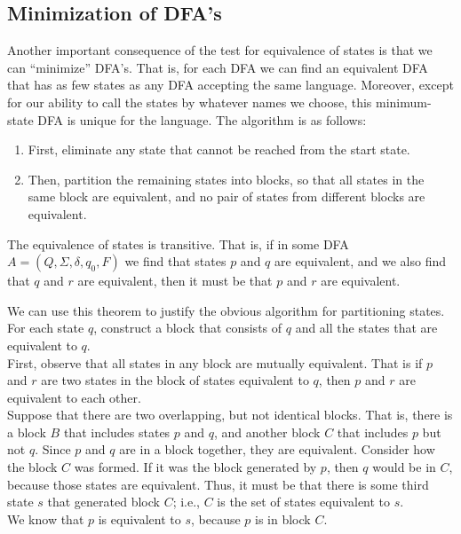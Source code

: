 \documentclass[]{article}
\begin{document}
  \subsection*{Minimization of DFA's}
    Another important consequence of the test for equivalence of states is that
    we can ``minimize'' DFA's. That is, for each DFA we can find an equivalent
    DFA that has as few states as any DFA accepting the same language. Moreover,
    except for our ability to call the states by whatever names we choose, this
    minimum-state DFA is unique for the language. The algorithm is as follows:
      \begin{enumerate}
        \item First, eliminate any state that cannot be reached from the start
        state.
        \item Then, partition the remaining states into blocks, so that all
        states in the same block are equivalent, and no pair of states from
        different blocks are equivalent.
      \end{enumerate}
      \begin{thm}
        The equivalence of states is transitive. That is, if in some DFA $A =
        (Q, \Sigma, \delta, q_0, F)$ we find that states $p$ and $q$ are
        equivalent, and we also find that $q$ and $r$ are equivalent, then it
        must be that $p$ and $r$ are equivalent.
      \end{thm}
    We can use this theorem to justify the obvious algorithm for partitioning
    states. For each state $q$, construct a block that consists of $q$ and all
    the states that are equivalent to $q$. \\
    First, observe that all states in any block are mutually equivalent. That is
    if $p$ and $r$ are two states in the block of states equivalent to $q$, then
    $p$ and $r$ are equivalent to each other. \\
    \indent Suppose that there are two overlapping, but not identical blocks.
    That is, there is a block $B$ that includes states $p$ and $q$, and another
    block $C$ that includes $p$ but not $q$. Since $p$ and $q$ are in a block
    together, they are equivalent. Consider how the block $C$ was formed. If it
    was the block generated by $p$, then $q$ would be in $C$, because those
    states are equivalent. Thus, it must be that there is some third state $s$
    that generated block $C$; i.e., $C$ is the set of states equivalent to
    $s$. \\
    \indent We know that $p$ is equivalent to $s$, because $p$ is in block $C$.
\end{document}
